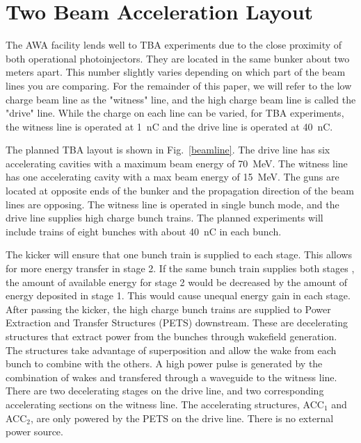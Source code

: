 \documentclass[letterpaper,  %
              ]{jacow-2_3}   %
\begin{document}
\section{Two Beam Acceleration Layout}
The AWA facility lends well to TBA experiments due to the 
close proximity of both operational photoinjectors. 
They are located in the same bunker about two meters apart.
This number slightly varies depending on which part of the beam 
lines you are comparing. For the remainder of this paper, we will
refer to the low charge beam line as the "witness" line, 
and the high charge beam line is called the "drive" line.
While the charge on each line can be varied, for TBA experiments, 
the witness line is operated at \SI{1}{nC} and the drive line
is operated at \SI{40}{nC}.

The planned TBA layout is shown in Fig.~\ref{beamline}.
The drive line has six accelerating 
cavities with a maximum beam energy of \SI{70}{MeV}. 
The witness line has one accelerating cavity with a max beam energy of \SI{15}{MeV}.
The guns are located at opposite ends of the bunker and 
the propagation direction of the beam lines are opposing.
The witness line is operated in single bunch mode, and 
the drive line supplies high charge bunch trains. 
The planned experiments will include trains of eight bunches
with about \SI{40}{nC} in each bunch.

\begin{figure*}[!tbh]
	\centering
	\begin{tikzpicture}[scale=\textwidth/33cm, text=black]
	
	\end{tikzpicture}
	\caption{TBA beam line layout at the AWA. The arrow at the end of each line indicates what direction the beam is traveling.
		PETS stands for Power Extraction and Transfer Structure, and ACC
		stands for Accelerating structure. The subscript index on each structure refers to which stage the structures belong to, first or second stage. }
	\label{beamline}
\end{figure*}

The kicker will ensure that one bunch train is supplied to 
each stage. This allows for more energy transfer in stage 2.
If the same bunch train supplies both stages \cite{tba}, the amount
of available energy for stage 2 would be decreased by the 
amount of energy deposited in stage 1. This would cause
unequal energy gain in each stage.
After passing the kicker, 
the high charge bunch trains are supplied to Power Extraction
and Transfer Structures (PETS) downstream. These are decelerating 
structures that extract power from the bunches through wakefield generation.
The structures take advantage of superposition and allow the wake from each 
bunch to combine with the others. A high power pulse is generated by 
the combination of wakes and transfered through a waveguide to the 
witness line. 
There are two decelerating stages on the drive line, and two 
corresponding accelerating sections on the witness line.
The accelerating structures, ACC$_1$ and ACC$_2$, are only 
powered by the PETS on the drive line. There is no  
external power source. 
\end{document}
